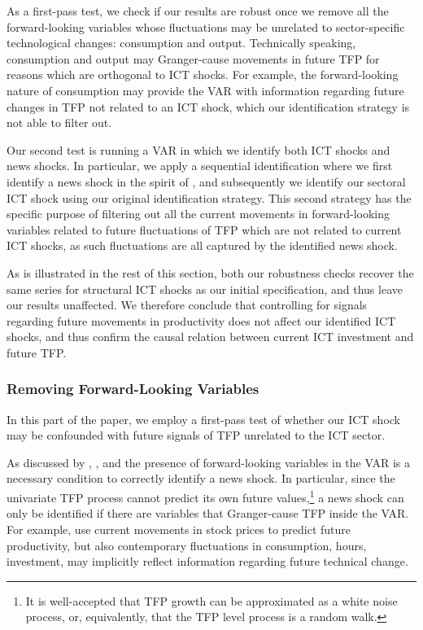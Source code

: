\documentclass[12pt]{article}
\begin{document}
As a first-pass test, %
we check if our results are robust once we remove all the forward-looking variables whose fluctuations may be unrelated to sector-specific technological changes: consumption and output. Technically speaking, consumption and output may Granger-cause movements in future TFP for reasons which are orthogonal to ICT shocks. For example, the forward-looking nature of consumption may provide the VAR with information regarding future changes in TFP not related to an ICT shock, which our identification strategy is not able to filter out. 

Our second test is running a VAR in which we identify both ICT shocks and news shocks. In particular, we apply a sequential identification where we first identify a news shock in the spirit of \cite{barsky2011news}, and subsequently we identify our sectoral ICT shock using our original identification strategy. This second strategy has the specific purpose of filtering out all the current movements in forward-looking variables related to future fluctuations of TFP which are not related to current ICT shocks, as such fluctuations are all captured by the identified news shock.

As is illustrated in the rest of this section, both our robustness checks recover the same series for structural ICT shocks as our initial specification, and thus leave our results unaffected. We therefore conclude that controlling for signals regarding future movements in productivity does not affect our identified ICT shocks, and thus confirm the causal relation between current ICT investment and future TFP.

\subsubsection{Removing Forward-Looking Variables}

In this part of the paper, we employ a first-pass test of whether our ICT shock may be confounded with future signals of TFP unrelated to the ICT sector. 

As discussed by \cite{sims2012news}, \cite{forni2014sufficient}, and \cite{barsky2015whither} the presence of forward-looking variables in the VAR is a necessary condition to correctly identify a news shock. In particular, since the univariate TFP process cannot predict its own future values,\footnote{It is well-accepted that TFP growth can be approximated as a white noise process, or, equivalently, that the TFP level process is a random walk.} a news shock can only be identified if there are variables that Granger-cause TFP inside the VAR. For example, \cite{beaudry2006stock} use current movements in stock prices to predict future productivity, but also contemporary fluctuations in consumption, hours, investment, may implicitly reflect information regarding future technical change.
\end{document}
